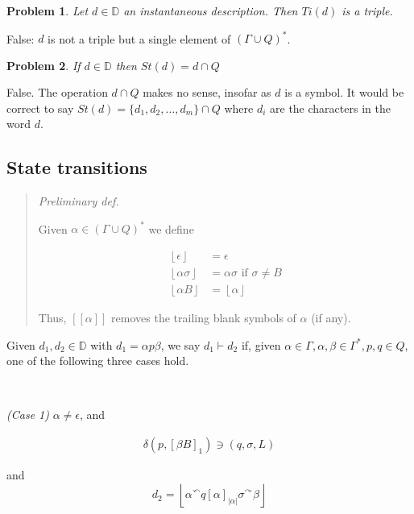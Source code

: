 \documentclass[a4paper, 12pt]{article}
\newtheorem{problem}{Problem}
\newtheorem{problem}{Problem}
\begin{document}
\begin{problem}
    Let $d \in \mathbb{D}$ an instantaneous description. Then $Ti(d)$ is a
    triple.
\end{problem}

False: $d$ is not a triple but a single element of $(\Gamma \cup Q)^{*}$.

\begin{problem}
    If $d \in \mathbb{D}$ then $St(d) = d \cap Q$
\end{problem}

False. The operation $d \cap Q$ makes no sense, insofar as $d$ is a symbol. It
would be correct to say $St(d) = \{d_1, d_2, \ldots, d_m\} \cap Q$ where $d_i$ are
the characters in the word $d$.

\subsection{State transitions}

\small
\begin{quote}
\textit{Preliminary def. }

Given $\alpha \in (\Gamma \cup Q)^*$ we define 

\begin{align*}
    \left\lfloor \epsilon \right\rfloor  &= \epsilon \\ 
    \left\lfloor \alpha \sigma  \right\rfloor  &= \alpha \sigma \text{   if } \sigma \neq B \\ 
    \left\lfloor \alpha B \right\rfloor &= \left\lfloor  \alpha \right\rfloor
\end{align*}

Thus, $[[ \alpha ]]$ removes the trailing blank symbols of $\alpha$ (if any).
\end{quote}
\normalsize 

Given $d_1, d_2 \in \mathbb{D}$ with $d_1 = \alpha p \beta $, we say $d_1 \vdash
d_2$ if, given $\alpha \in \Gamma, \alpha, \beta \in  \Gamma^*, p, q \in Q$, one
of the following three cases hold.

~

\textit{(Case 1)} $\alpha \neq \epsilon$, and

\begin{align*}
    \delta \left( p, \left[ \beta B \right]_1  \right) \ni (q, \sigma, L)
\end{align*}

and 
$$d_2 = \left\lfloor \alpha {}^{\curvearrowleft} q [\alpha]_{|\alpha|} \sigma
{}^{\curvearrowright} \beta  \right\rfloor$$
\end{document}
